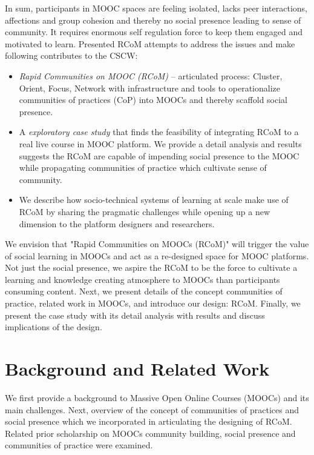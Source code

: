 \documentclass[format=acmsmall, review=false, screen=true]{acmart}
\begin{document}
In sum, participants in MOOC spaces are feeling isolated, lacks peer interactions, affections and group cohesion and thereby no social presence leading to sense of community. It requires enormous self regulation force to keep them engaged and motivated to learn. Presented RCoM attempts to address the issues and make following contributes to the CSCW: 

\begin{itemize}
\item \textit{Rapid Communities on MOOC (RCoM)} -- articulated process: Cluster, Orient, Focus, Network with infrastructure and tools to operationalize communities of practices (CoP) into MOOCs and thereby scaffold social presence. 
\item A \textit{exploratory case study} that finds the feasibility of integrating RCoM to a real live course in MOOC platform. We provide a detail analysis and results suggests the RCoM are capable of impending social presence to the MOOC while propagating communities of practice which cultivate sense of community.
\item We describe how socio-technical systems of learning at scale make use of RCoM by sharing the pragmatic challenges while opening up a new dimension to the platform designers and researchers. 
\end{itemize}

We envision that "Rapid Communities on MOOCs (RCoM)" will trigger the value of social learning in MOOCs and act as a re-designed space for MOOC platforms. Not just the social presence, we aspire the RCoM to be the force to cultivate a learning and knowledge creating atmosphere to MOOCs than participants consuming content. Next, we present details of the concept communities of practice, related work in MOOCs, and introduce our design: RCoM. Finally, we present the case study with its detail analysis with results and discuss implications of the design.

\section{Background and Related Work}
We first provide a background to Massive Open Online Courses (MOOCs) and its main challenges. Next, overview of the concept of communities of practices and social presence which we incorporated in articulating the designing of RCoM. Related prior scholarship on MOOCs community building, social presence and communities of practice were examined. 
\end{document}
